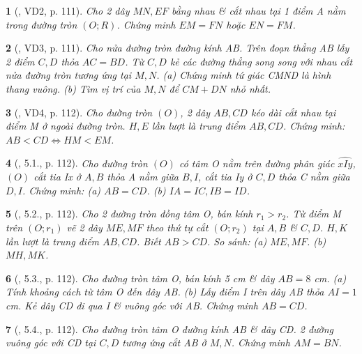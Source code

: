 \documentclass{article}
\newtheorem{baitoan}{}
\begin{document}
\begin{baitoan}[\cite{Binh_boi_duong_Toan_9_tap_1}, VD2, p. 111]
	Cho 2 dây $MN,EF$ bằng nhau \& cắt nhau tại 1 điểm A nằm trong đường tròn $(O;R)$. Chứng minh $EM = FN$ hoặc $EN = FM$.
\end{baitoan}

\begin{baitoan}[\cite{Binh_boi_duong_Toan_9_tap_1}, VD3, p. 111]
	Cho nửa đường tròn đường kính AB. Trên đoạn thẳng AB lấy 2 điểm $C,D$ thỏa $AC = BD$. Từ $C,D$ kẻ các đường thẳng song song với nhau cắt nửa đường tròn tương ứng tại $M,N$. (a) Chứng minh tứ giác CMND là hình thang vuông. (b) Tìm vị trí của $M,N$ để $CM + DN$ nhỏ nhất.
\end{baitoan}

\begin{baitoan}[\cite{Binh_boi_duong_Toan_9_tap_1}, VD4, p. 112]
	Cho đường tròn $(O)$, 2 dây $AB,CD$ kéo dài cắt nhau tại điểm M ở ngoài đường tròn. $H,E$ lần lượt là trung điểm $AB,CD$. Chứng minh: $AB < CD\Leftrightarrow HM < EM$.
\end{baitoan}

\begin{baitoan}[\cite{Binh_boi_duong_Toan_9_tap_1}, 5.1., p. 112]
	Cho đường tròn $(O)$ có tâm O nằm trên đường phân giác $\widehat{xIy}$, $(O)$ cắt tia Ix ở $A,B$ thỏa A nằm giữa $B,I$, cắt tia Iy ở $C,D$ thỏa C nằm giữa $D,I$. Chứng minh: (a) $AB = CD$. (b) $IA = IC,IB = ID$.
\end{baitoan}

\begin{baitoan}[\cite{Binh_boi_duong_Toan_9_tap_1}, 5.2., p. 112]
	Cho 2 đường tròn đồng tâm O, bán kính $r_1 > r_2$. Từ điểm M trên $(O;r_1)$ vẽ 2 dây $ME,MF$ theo thứ tự cắt $(O;r_2)$ tại $A,B$ \& $C,D$. $H,K$ lần lượt là trung điểm $AB,CD$. Biết $AB > CD$. So sánh: (a) $ME,MF$. (b) $MH,MK$.
\end{baitoan}

\begin{baitoan}[\cite{Binh_boi_duong_Toan_9_tap_1}, 5.3., p. 112]
	Cho đường tròn tâm O, bán kính {\rm5 cm} \& dây $AB = 8$ {\rm cm}. (a) Tính khoảng cách từ tâm O đến dây AB. (b) Lấy điểm I trên dây AB thỏa $AI = 1$ {\rm cm}. Kẻ dây CD đi qua I \& vuông góc với AB. Chứng minh $AB = CD$.
\end{baitoan}

\begin{baitoan}[\cite{Binh_boi_duong_Toan_9_tap_1}, 5.4., p. 112]
	Cho đường tròn tâm O đường kính AB \& dây CD. 2 đường vuông góc với CD tại $C,D$ tương ứng cắt AB ở $M,N$. Chứng minh $AM = BN$.
\end{baitoan}
\end{document}
